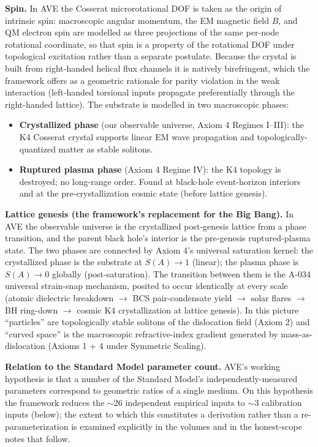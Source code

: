 \vspace{0.5em}
\noindent \textbf{Spin.} In AVE the Cosserat microrotational DOF is taken as the origin of intrinsic spin: macroscopic angular momentum, the EM magnetic field $B$, and QM electron spin are modelled as three projections of the same per-node rotational coordinate, so that spin is a property of the rotational DOF under topological excitation rather than a separate postulate. Because the crystal is built from right-handed helical flux channels it is natively birefringent, which the framework offers as a geometric rationale for parity violation in the weak interaction (left-handed torsional inputs propagate preferentially through the right-handed lattice). The substrate is modelled in two macroscopic phases:

\begin{itemize}\itemsep 0pt
    \item \textbf{Crystallized phase} (our observable universe, Axiom 4 Regimes I--III): the K4 Cosserat crystal supports linear EM wave propagation and topologically-quantized matter as stable solitons.
    \item \textbf{Ruptured plasma phase} (Axiom 4 Regime IV): the K4 topology is destroyed; no long-range order. Found at black-hole event-horizon interiors and at the pre-crystallization cosmic state (before lattice genesis).
\end{itemize}

\noindent \textbf{Lattice genesis (the framework's replacement for the Big Bang).} In AVE the observable universe is the crystallized post-genesis lattice from a phase transition, and the parent black hole's interior is the pre-genesis ruptured-plasma state. The two phases are connected by Axiom 4's universal saturation kernel: the crystallized phase is the substrate at $S(A) \to 1$ (linear); the plasma phase is $S(A) \to 0$ globally (post-saturation). The transition between them is the A-034 universal strain-snap mechanism, posited to occur identically at every scale (atomic dielectric breakdown $\to$ BCS pair-condensate yield $\to$ solar flares $\to$ BH ring-down $\to$ cosmic K4 crystallization at lattice genesis). In this picture ``particles'' are topologically stable solitons of the dislocation field (Axiom 2) and ``curved space'' is the macroscopic refractive-index gradient generated by mass-as-dislocation (Axioms 1 + 4 under Symmetric Scaling).

\vspace{0.5em}
\noindent \textbf{Relation to the Standard Model parameter count.} AVE's working hypothesis is that a number of the Standard Model's independently-measured parameters correspond to geometric ratios of a single medium. On this hypothesis the framework reduces the $\sim$26 independent empirical inputs to $\sim$3 calibration inputs (below); the extent to which this constitutes a derivation rather than a re-parameterization is examined explicitly in the volumes and in the honest-scope notes that follow.

